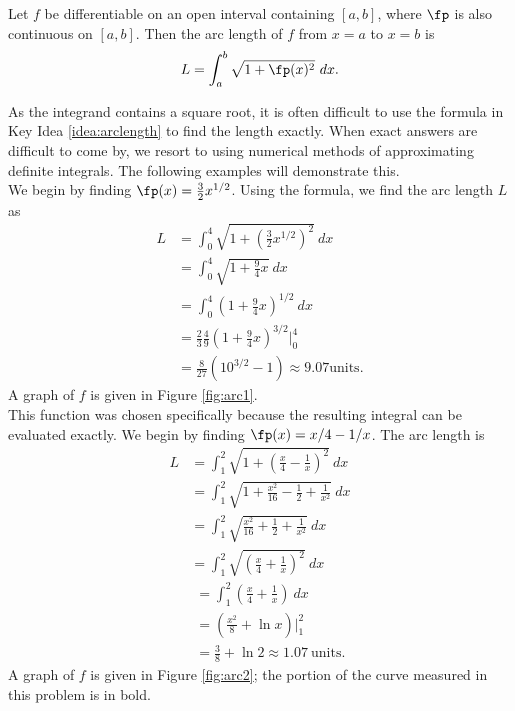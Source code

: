 {Let $f$ be differentiable on an open interval containing $[a,b]$, where $\fp$ is also continuous on $[a,b]$. Then the arc length of $f$ from $x=a$ to $x=b$ is
$$L = \int_a^b \sqrt{1+\fp(x)^2}\ dx.$$
}

As the integrand contains a square root, it is often difficult to use the formula in Key Idea \ref{idea:arclength} to find the length exactly. When exact answers are difficult to come by, we resort to using numerical methods of approximating definite integrals. The following examples will demonstrate this.\\

{We begin by finding $\fp(x)= \frac32x^{1/2}$. Using the formula, we find the arc length $L$ as
\begin{align*}
	L &=	\int_0^4 \sqrt{1+\left(\frac32x^{1/2}\right)^2}\ dx \\
		&=	\int_0^4 \sqrt{1+\frac94x} \ dx \\
		&= 	\int_0^4 \left(1+\frac94x\right)^{1/2}\ dx \\
		&=  \frac23\frac49\left(1+\frac94x\right)^{3/2}\Big|_0^4 \\
		&=\frac{8}{27}\left(10^{3/2}-1\right) \approx 9.07 \text{units}.
\end{align*}
	A graph of $f$ is given in Figure \ref{fig:arc1}. 
}\\

{This function was chosen specifically because the resulting integral can be evaluated exactly. We begin by finding $\fp(x) = x/4-1/x$. The arc length is 
\begin{align*}
L		&=  \int_1^2 \sqrt{1+ \left(\frac x4-\frac1x\right)^2}\ dx \\
		&= 	\int_1^2 \sqrt{1 + \frac{x^2}{16} -\frac12 + \frac1{x^2} } \ dx \\
		&=	\int_1^2 \sqrt{\frac{x^2}{16} +\frac12 + \frac1{x^2} } \ dx \\
		&=	\int_1^2	\sqrt{ \left(\frac x4 + \frac1x\right)^2}\ dx 
\end{align*}
\begin{align*}
\phantom{L}
				&= \int_1^2 \left(\frac x4 + \frac1x\right) \ dx \\
		&=  \left(\frac{x^2}8 + \ln x\right)\Bigg|_1^2\\
		&=	\frac38+\ln 2 \approx 1.07 \ \text{units}.
\end{align*}
A graph of $f$ is given in Figure \ref{fig:arc2}; the portion of the curve measured in this problem is in bold.
}\\

